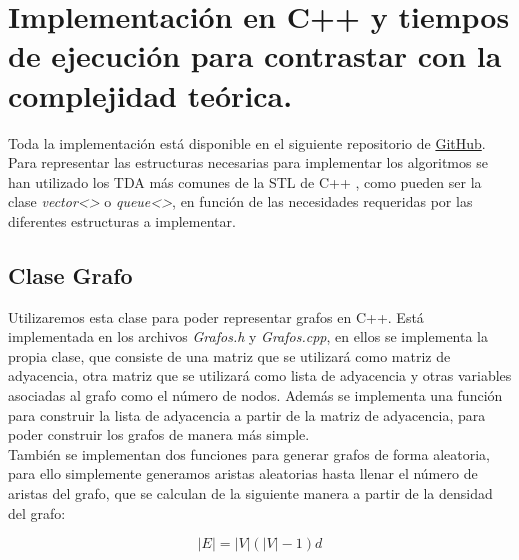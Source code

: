
\chapter{Implementación en C++ y tiempos de ejecución para contrastar con la complejidad teórica.}\label{ch:quinto-capitulo}

Toda la implementación está disponible en el siguiente repositorio de \href{https://github.com/PabloC01/TFG}{GitHub}. \\

Para representar las estructuras necesarias para implementar los algoritmos se han utilizado los TDA más comunes de la STL de C++ \cite{alma991014010751904990}, como pueden ser la clase \textit{vector<>} o \textit{queue<>}, en función de las necesidades requeridas por las diferentes estructuras a implementar.

\section{Clase Grafo}

Utilizaremos esta clase para poder representar grafos en C++. Está implementada en los archivos \textit{Grafos.h} y \textit{Grafos.cpp}, en ellos se implementa la propia clase, que consiste de una matriz que se utilizará como matriz de adyacencia, otra matriz que se utilizará como lista de adyacencia y otras variables asociadas al grafo como el número de nodos. Además se implementa una función para construir la lista de adyacencia a partir de la matriz de adyacencia, para poder construir los grafos de manera más simple. \\

También se implementan dos funciones para generar grafos de forma aleatoria, para ello simplemente generamos aristas aleatorias hasta llenar el número de aristas del grafo, que se calculan de la siguiente manera a partir de la densidad del grafo:

$$|E| = |V|(|V| - 1)d$$

